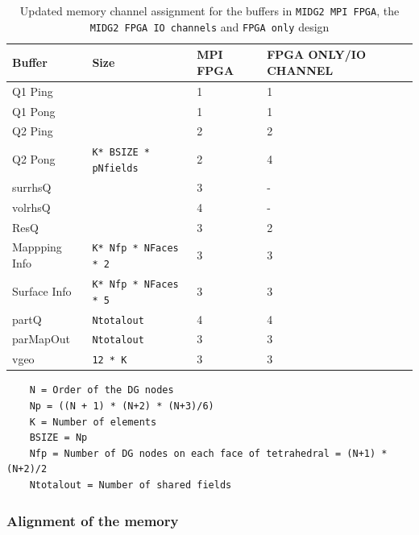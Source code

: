 \begin{table}[ht]
    \begin{center}
        \caption{Updated memory channel assignment for the buffers in \texttt{MIDG2 MPI FPGA}, the \texttt{MIDG2 FPGA IO channels} and
        \texttt{FPGA only} design}
        \label{tab:channel_assign}
        \begin{tabular}{|l|l|C{3cm}|C{3.4cm}|} %
          \hline
          \textbf{Buffer} & \textbf{Size} & \textbf{MPI FPGA} & \textbf{FPGA ONLY/IO CHANNEL}\\
          \hline
          Q1 Ping &   & 1 & 1 \\
           
          Q1 Pong &  & 1 & 1 \\
           
          Q2 Ping &   & 2 & 2 \\
           
          Q2 Pong & \texttt{K* BSIZE * pNfields}  & 2 & 4 \\
           
          surrhsQ &   & 3 & - \\
           
          volrhsQ & & 4 & - \\
           
          ResQ & & 3 & 2 \\
          \hline
          Mappping Info & \texttt{K* Nfp * NFaces * 2}  & 3 & 3 \\
          \hline
          Surface Info & \texttt{K* Nfp * NFaces * 5} & 3 & 3 \\
          \hline
          partQ & \texttt{Ntotalout} & 4 & 4 \\
          \hline
          parMapOut & \texttt{Ntotalout}  & 3 & 3 \\
          \hline
          vgeo & \texttt{12 * K}  & 3 & 3 \\
          \hline
        \end{tabular}
    \end{center}
 \end{table}
 \begin{verbatim}
    N = Order of the DG nodes
    Np = ((N + 1) * (N+2) * (N+3)/6)
    K = Number of elements
    BSIZE = Np
    Nfp = Number of DG nodes on each face of tetrahedral = (N+1) * (N+2)/2
    Ntotalout = Number of shared fields
\end{verbatim}

\subsubsection*{Alignment of the memory}

